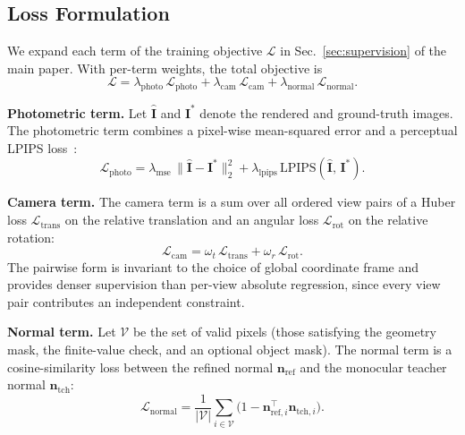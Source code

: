\documentclass{llmxive}
\providecommand{\boldstart}[1]{\vspace{0.1in}\noindent\textbf{#1}}
\begin{document}
\subsection{Loss Formulation}
\label{sec:app_loss}

We expand each term of the training objective $\mathcal{L}$ in Sec.~\ref{sec:supervision} of the main paper. With per-term weights, the total objective is
\begin{equation}
    \mathcal{L} = \lambda_{\mathrm{photo}}\,\mathcal{L}_{\mathrm{photo}} + \lambda_{\mathrm{cam}}\,\mathcal{L}_{\mathrm{cam}} + \lambda_{\mathrm{normal}}\,\mathcal{L}_{\mathrm{normal}}.
    \label{eq:app_total}
\end{equation}

\boldstart{Photometric term.}
Let $\hat{\mathbf{I}}$ and $\mathbf{I}^{*}$ denote the rendered and ground-truth images. The photometric term combines a pixel-wise mean-squared error and a perceptual LPIPS loss~\citep{zhang2018unreasonable}:
\begin{equation}
    \mathcal{L}_{\mathrm{photo}} = \lambda_{\mathrm{mse}}\,\bigl\|\hat{\mathbf{I}} - \mathbf{I}^{*}\bigr\|_2^2 + \lambda_{\mathrm{lpips}}\,\mathrm{LPIPS}(\hat{\mathbf{I}},\,\mathbf{I}^{*}).
    \label{eq:app_photo}
\end{equation}

\boldstart{Camera term.}
The camera term is a sum over all ordered view pairs of a Huber loss $\mathcal{L}_{\mathrm{trans}}$ on the relative translation and an angular loss $\mathcal{L}_{\mathrm{rot}}$ on the relative rotation:
\begin{equation}
    \mathcal{L}_{\mathrm{cam}} = \omega_t\,\mathcal{L}_{\mathrm{trans}} + \omega_r\,\mathcal{L}_{\mathrm{rot}}.
    \label{eq:app_cam}
\end{equation}
The pairwise form is invariant to the choice of global coordinate frame and provides denser supervision than per-view absolute regression, since every view pair contributes an independent constraint.

\boldstart{Normal term.}
Let $\mathcal{V}$ be the set of valid pixels (those satisfying the geometry mask, the finite-value check, and an optional object mask). The normal term is a cosine-similarity loss between the refined normal $\mathbf{n}_{\mathrm{ref}}$ and the monocular teacher normal $\mathbf{n}_{\mathrm{tch}}$:
\begin{equation}
    \mathcal{L}_{\mathrm{normal}} = \frac{1}{|\mathcal{V}|}\sum_{i \in \mathcal{V}} \bigl(1 - \mathbf{n}_{\mathrm{ref},i}^{\top}\mathbf{n}_{\mathrm{tch},i}\bigr).
    \label{eq:app_normal}
\end{equation}
\end{document}
